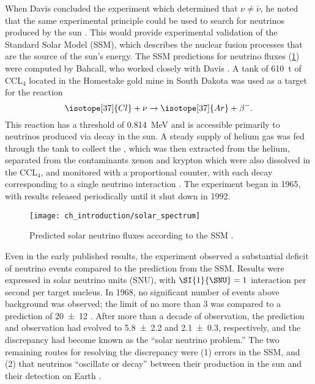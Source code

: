 When Davis concluded the experiment which determined that $\nu\neq\bar{\nu}$,
he noted that the same experimental principle could be used
to search for neutrinos produced by the sun \cite{davis_diff_nuebar}.
This would provide experimental validation of the Standard Solar Model (SSM),
which describes the nuclear fusion processes
that are the source of the sun's energy.
The SSM predictions for neutrino fluxes (\cref{fig:solarflux})
were computed by Bahcall,
who worked closely with Davis \cite{bahcall2004}.
A tank of \SI{610}{\tonne} of $\text{CCL}_4$
located in the Homestake gold mine in South Dakota
was used as a target for the reaction
\begin{equation}\label{eq:davis_nu}
    \isotope[37]{Cl} + \nu \to \isotope[37]{Ar} + \beta^-.
\end{equation}
This reaction has a threshold of \SI{0.814}{\MeV} \cite{solar_review}
and is accessible primarily to neutrinos
produced via  decay in the sun.
A steady supply of helium gas was fed through the tank
to collect the ,
which was then extracted from the helium,
separated from the contaminants xenon and krypton which were
also dissolved in the $\text{CCL}_4$,
and monitored with a proportional counter,
with each decay corresponding to a single neutrino interaction \cite{homestake1968}.
The experiment began in 1965, with results released periodically
until it shut down in 1992.

\begin{figure}
    \texttt{[image: ch\_introduction/solar\_spectrum]}
    \caption{
        Predicted solar neutrino fluxes according to the SSM \cite{bahcall2004}.
    }
    \label{fig:solarflux}
\end{figure}

Even in the early published results,
the experiment observed a substantial deficit of neutrino events
compared to the prediction from the SSM.
Results were expressed in solar neutrino units (SNU),
with $\SI{1}{\SNU} = 1$ interaction per second per target nucleus.
In 1968, no significant number of events above background was observed;
the limit of no more than \SI{3}{\SNU} was compared to a prediction of
\SI{20\pm12}{\SNU} \cite{homestake1968}.
After more than a decade of observation,
the prediction and observation had evolved to \SI{5.8\pm2.2}{\SNU}
and \SI{2.1\pm0.3}{\SNU}, respectively,
and the discrepancy had become known as the ``solar neutrino problem.''
The two remaining routes for resolving the discrepancy were
(1) errors in the SSM, and (2) that neutrinos ``oscillate or decay''
between their production in the sun and their detection on Earth \cite{davis1985}.

